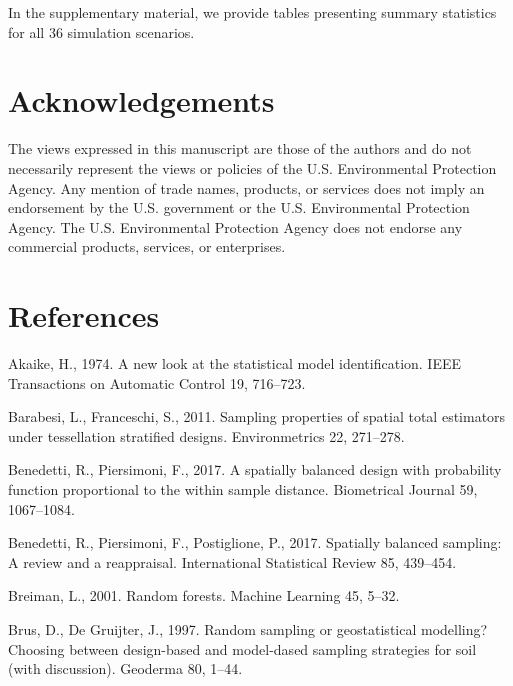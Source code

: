 \documentclass[]{elsarticle} %
\begin{document}
In the supplementary material, we provide tables presenting summary
statistics for all 36 simulation scenarios.

\hypertarget{acknowledgements}{%
\section*{Acknowledgements}\label{acknowledgements}}

The views expressed in this manuscript are those of the authors and do
not necessarily represent the views or policies of the U.S.
Environmental Protection Agency. Any mention of trade names, products,
or services does not imply an endorsement by the U.S. government or the
U.S. Environmental Protection Agency. The U.S. Environmental Protection
Agency does not endorse any commercial products, services, or
enterprises.

\hypertarget{references}{%
\section*{References}\label{references}}

\hypertarget{refs}{}
\leavevmode\hypertarget{ref-akaike1974new}{}%
Akaike, H., 1974. A new look at the statistical model identification.
IEEE Transactions on Automatic Control 19, 716--723.

\leavevmode\hypertarget{ref-barabesi2011sampling}{}%
Barabesi, L., Franceschi, S., 2011. Sampling properties of spatial total
estimators under tessellation stratified designs. Environmetrics 22,
271--278.

\leavevmode\hypertarget{ref-benedetti2017spatially}{}%
Benedetti, R., Piersimoni, F., 2017. A spatially balanced design with
probability function proportional to the within sample distance.
Biometrical Journal 59, 1067--1084.

\leavevmode\hypertarget{ref-benedetti2017spatiallyreview}{}%
Benedetti, R., Piersimoni, F., Postiglione, P., 2017. Spatially balanced
sampling: A review and a reappraisal. International Statistical Review
85, 439--454.

\leavevmode\hypertarget{ref-breiman2001random}{}%
Breiman, L., 2001. Random forests. Machine Learning 45, 5--32.

\leavevmode\hypertarget{ref-brus1997random}{}%
Brus, D., De Gruijter, J., 1997. Random sampling or geostatistical
modelling? Choosing between design-based and model-dased sampling
strategies for soil (with discussion). Geoderma 80, 1--44.
\end{document}
